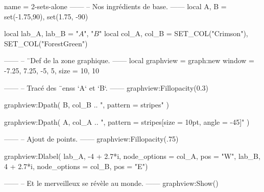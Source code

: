 \documentclass{standalone}
\begin{document}
\begin{luadraw}{name = 2-sets-alone}
------
-- Nos ingrédients de base.
------
local A, B = set(-1.75,90), set(1.75, -90)

local lab_A, lab_B = "$A$", "$B$"
local col_A, col_B = SET_COL("Crimson"), SET_COL("ForestGreen")

------
-- ¨Def de la zone graphique.
------
local graphview = graph:new{
  window = {-7.25, 7.25, -5, 5},
  size   = {10, 10}
}

------
-- Tracé des ¨enss `A` et `B`.
------
graphview:Fillopacity(0.3)

graphview:Dpath(
  B,
  col_B .. ", pattern = stripes"
)

graphview:Dpath(
  A,
  col_A .. ", pattern = {stripes[size = 10pt, angle = -45]}"
)

------
-- Ajout de points.
------
graphview:Fillopacity(.75)

graphview:Dlabel(
  lab_A, -4 + 2.7*i, {node_options = col_A, pos = "W"},
  lab_B,  4 + 2.7*i, {node_options = col_B, pos = "E"})

------
-- Et le merveilleux se révèle au monde.
------
graphview:Show()
\end{luadraw}
\end{document}
